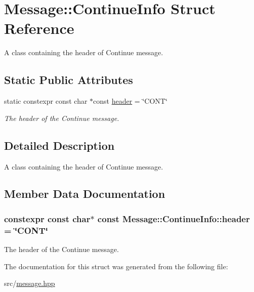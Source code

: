 \hypertarget{struct_message_1_1_continue_info}{\section{Message\-:\-:Continue\-Info Struct Reference}
\label{struct_message_1_1_continue_info}
}


A class containing the header of Continue message.  


\subsection*{Static Public Attributes}
\begin{DoxyCompactItemize}
\item 
static constexpr const char $\ast$const \hyperlink{struct_message_1_1_continue_info_ae80c96209d5d458d4abdf847e53f3437}{header} = \char`\"{}C\-O\-N\-T\char`\"{}
\begin{DoxyCompactList}\small\item\em The header of the Continue message. \end{DoxyCompactList}\end{DoxyCompactItemize}


\subsection{Detailed Description}
A class containing the header of Continue message. 

\subsection{Member Data Documentation}
\hypertarget{struct_message_1_1_continue_info_ae80c96209d5d458d4abdf847e53f3437}{
\subsubsection[{header}]{\setlength{\rightskip}{0pt plus 5cm}constexpr const char$\ast$ const Message\-::\-Continue\-Info\-::header = \char`\"{}C\-O\-N\-T\char`\"{}\hspace{0.3cm}{\ttfamily [static]}}}\label{struct_message_1_1_continue_info_ae80c96209d5d458d4abdf847e53f3437}


The header of the Continue message. 



The documentation for this struct was generated from the following file\-:\begin{DoxyCompactItemize}
\item 
src/\hyperlink{message_8hpp}{message.\-hpp}\end{DoxyCompactItemize}

